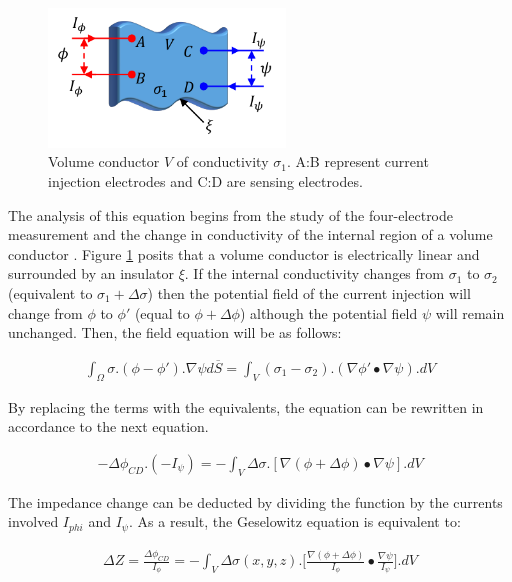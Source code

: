 \begin{figure}[!htpb]
	\centering
	\includegraphics[width=6.3cm,keepaspectratio]{figure9}    
	\caption[Volume conductor with 4 electrodes]{Volume conductor $V$ of conductivity $\sigma_1$. A:B represent current injection electrodes and C:D are sensing electrodes.}
	\label{fig:volume}
\end{figure}

The analysis of this equation begins from the study of the four-electrode measurement and the change in conductivity of the internal region of a volume conductor \cite{bertemes2002tissue}. Figure \ref{fig:volume} posits that a volume conductor is electrically linear and surrounded by an insulator $\xi$. If the internal conductivity changes from $\sigma_1$ to $\sigma_2$ (equivalent to $\sigma_1+\Delta \sigma$) then the potential field of the current injection will change from $\phi$ to $\phi \prime$ (equal to $\phi+\Delta \phi$) although the potential field $\psi$ will remain unchanged. Then, the field equation will be as follows:

\begin{align}
	\label{eq:potential field}
	\int_{\Omega} \sigma . (\phi - \phi \prime) . \nabla \psi d \overline{S} = \int_{V} (\sigma_1 - \sigma_2).(\nabla \phi \prime \bullet \nabla \psi).dV 
\end{align}

By replacing the terms with the equivalents, the equation can be rewritten in accordance to the next equation.

\begin{align}
	\label{eq:potential field2}
	- \Delta \phi_{CD} . (-I_{\psi}) = - \int_{V} \Delta \sigma . [\nabla (\phi + \Delta \phi) \bullet \nabla \psi].dV
\end{align}

The impedance change can be deducted by dividing the function by the currents involved $I_{phi}$ and $I_{\psi}$. As a result, the Geselowitz equation is equivalent to:

\begin{align}
	\label{eq:Geselowitz}
	\Delta Z = \frac{\Delta \phi_{CD}}{I_\phi} = - \int_V \Delta \sigma (x,y,z).\bigg[\frac{\nabla(\phi + \Delta \phi)}{I_{\phi}} \bullet \frac{\nabla \psi}{I_{\psi}}\bigg].dV
\end{align}

